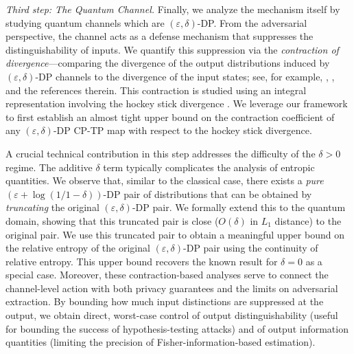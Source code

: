 \documentclass[onecolumn,ldraftcls, 11pt]{IEEEtran}
\newcommand{\eps}{\varepsilon}
\begin{document}
{\em Third step: The Quantum Channel.}
Finally, we analyze the mechanism itself by studying quantum channels which are $(\eps,\delta)$-DP. From the adversarial perspective, the channel acts as a defense mechanism that suppresses the distinguishability of inputs. We quantify this suppression via the \emph{contraction of divergence}---comparing the divergence of the output distributions induced by $(\eps,\delta)$-DP channels to the divergence of the input states; see, for example, \cite{Asoodeh24}, \cite{ZA23}, and the references therein.
This contraction is studied using an integral representation involving the hockey stick divergence \cite{Sason_2016}. We leverage our framework to first establish an almost tight upper bound on the contraction coefficient of any $(\eps,\delta)$-DP CP-TP map with respect to the hockey stick divergence.

A crucial technical contribution in this step addresses the difficulty of the $\delta > 0$ regime. The additive $\delta$ term typically complicates the analysis of entropic quantities. We observe that, similar to the classical case, there exists a \emph{pure} $(\eps + \log(1/1-\delta))$-DP pair of distributions that can be obtained by \emph{truncating} the original $(\eps,\delta)$-DP pair. We formally extend this to the quantum domain, showing that this truncated pair is close ($O(\delta)$ in $L_1$ distance) to the original pair. We use this truncated pair to obtain a meaningful upper bound on the relative entropy of the original $(\eps,\delta)$-DP pair using the continuity of relative entropy. This upper bound recovers the known result for $\delta=0$ \cite{KOV15,DRS22} as a special case.
Moreover, these contraction-based analyses serve to connect the channel-level action with both privacy guarantees and the limits on adversarial extraction. By bounding how much input distinctions are suppressed at the output, we obtain direct, worst-case control of output distinguishability (useful for bounding the success of hypothesis-testing attacks) and of output information quantities (limiting the precision of Fisher-information-based estimation).
\end{document}
